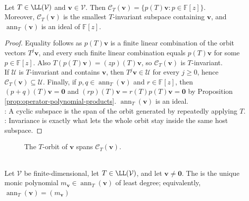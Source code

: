 \begin{proposition} \label{prop:cyclic-subspace-smallest-invariant-subspace} \\
Let $T\in\LL(\mathcal{V})$ and $\mathbf{v}\in\mathcal{V}$. Then $\mathcal{C}_T(\mathbf{v})=\{p(T)\mathbf{v}:p\in\mathbb{F}[z]\}$.\\
Moreover, $\mathcal{C}_T(\mathbf{v})$ is the smallest $T$-invariant subspace containing $\mathbf{v}$, and $\operatorname{ann}_T(\mathbf{v})$ is an ideal of $\mathbb{F}[z]$.
\begin{proof} Equality follows as $p(T)\mathbf{v}$ is a finite linear combination of the orbit vectors $T^j\mathbf{v}$, and every such finite linear combination equals $p(T)\mathbf{v}$ for some $p\in\mathbb{F}[z]$. Also $T(p(T)\mathbf{v})=(zp)(T)\mathbf{v}$, so $\mathcal{C}_T(\mathbf{v})$ is $T$-invariant.\\
If $\mathcal{U}$ is $T$-invariant and contains $\mathbf{v}$, then $T^j\mathbf{v}\in\mathcal{U}$ for every $j\geq0$, hence $\mathcal{C}_T(\mathbf{v})\subseteq\mathcal{U}$. Finally, if $p,q\in\operatorname{ann}_T(\mathbf{v})$ and $r\in\mathbb{F}[z]$, then $(p+q)(T)\mathbf{v}=\mathbf{0}$ and $(rp)(T)\mathbf{v}=r(T)p(T)\mathbf{v}=\mathbf{0}$ by Proposition \ref{prop:operator-polynomial-products}. $\operatorname{ann}_T(\mathbf{v})$ is an ideal.\\
: A cyclic subspace is the span of the orbit generated by repeatedly applying $T$.\\
: Invariance is exactly what lets the whole orbit stay inside the same host subspace.
\end{proof}
\end{proposition}

\begin{figure}[H]
  \centering
  
  \caption{The $T$-orbit of $\mathbf{v}$ spans $\mathcal{C}_T(\mathbf{v})$.}
  \label{fig:operator-cyclic-subspace-polynomial-action}
\end{figure}

\begin{definition} \label{def:vector-order-under-operator} \\
Let $\mathcal{V}$ be finite-dimensional, let $T\in\LL(\mathcal{V})$, and let $\mathbf{v}\neq\mathbf{0}$. The  is the unique monic polynomial $m_{\mathbf{v}}\in\operatorname{ann}_T(\mathbf{v})$ of least degree; equivalently, $\operatorname{ann}_T(\mathbf{v})=(m_{\mathbf{v}})$
\end{definition}

